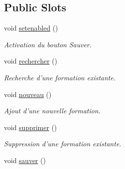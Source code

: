 \subsection*{Public Slots}
\begin{DoxyCompactItemize}
\item 
void \hyperlink{class_formation_window_afe595a0a344e7884a2199d49685b72c8}{setenabled} ()
\begin{DoxyCompactList}\small\item\em Activation du bouton Sauver. \end{DoxyCompactList}\item 
\hypertarget{class_formation_window_ab1bb1608745c98b9fb3d26df1dcd07cf}{void \hyperlink{class_formation_window_ab1bb1608745c98b9fb3d26df1dcd07cf}{rechercher} ()}\label{class_formation_window_ab1bb1608745c98b9fb3d26df1dcd07cf}

\begin{DoxyCompactList}\small\item\em Recherche d'une formation existante. \end{DoxyCompactList}\item 
void \hyperlink{class_formation_window_aa1a7bd64e46219b7751dc32322882f5e}{nouveau} ()
\begin{DoxyCompactList}\small\item\em Ajout d'une nouvelle formation. \end{DoxyCompactList}\item 
\hypertarget{class_formation_window_a5c6f76c574a7eb28810e718ce88faa40}{void \hyperlink{class_formation_window_a5c6f76c574a7eb28810e718ce88faa40}{supprimer} ()}\label{class_formation_window_a5c6f76c574a7eb28810e718ce88faa40}

\begin{DoxyCompactList}\small\item\em Suppression d'une formation existante. \end{DoxyCompactList}\item 
\hypertarget{class_formation_window_a9c6fb184cf96a862bd13cb30c17131d1}{void \hyperlink{class_formation_window_a9c6fb184cf96a862bd13cb30c17131d1}{sauver} ()}\label{class_formation_window_a9c6fb184cf96a862bd13cb30c17131d1}


\end{DoxyCompactItemize}
